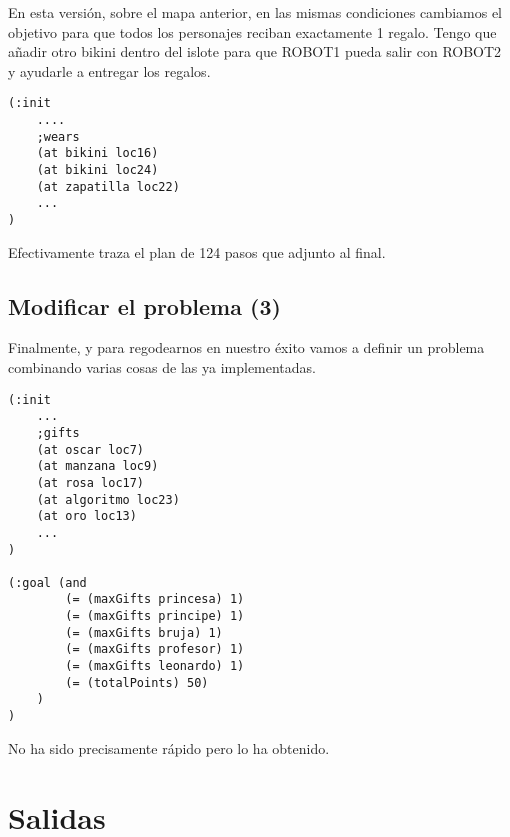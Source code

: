 \documentclass{article}
\newcommand{\img}[1]{
\noindent\makebox[0.9\textwidth][c]{\texttt{[image: \#1]}}%
}
\begin{document}
	En esta versión, sobre el mapa anterior, en las mismas condiciones cambiamos el objetivo para que todos los personajes reciban exactamente 1 regalo. Tengo que añadir otro bikini dentro del islote para que ROBOT1 pueda salir con ROBOT2 y ayudarle a entregar los regalos.
	
\begin{lstlisting}
(:init
	....	
	;wears
    (at bikini loc16)
    (at bikini loc24)
    (at zapatilla loc22)
    ...
)
\end{lstlisting}

\img{img/map7_2}

Efectivamente traza el plan de 124 pasos que adjunto al final.

\subsection{Modificar el problema (3)}
	Finalmente, y para regodearnos en nuestro éxito vamos a definir un problema combinando varias cosas de las ya implementadas.
	
\begin{lstlisting}
(:init
	...
	;gifts
    (at oscar loc7)
    (at manzana loc9)
    (at rosa loc17)
    (at algoritmo loc23)
    (at oro loc13)
    ...
)

(:goal (and
        (= (maxGifts princesa) 1)
        (= (maxGifts principe) 1)
        (= (maxGifts bruja) 1)
        (= (maxGifts profesor) 1)
        (= (maxGifts leonardo) 1)
        (= (totalPoints) 50)
    )
)
\end{lstlisting}
	
	No ha sido precisamente rápido pero lo ha obtenido.
	
\section{Salidas}
\end{document}
